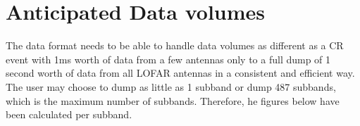 \documentclass[a4paper,10pt,bibtotoc]{scrartcl}
\begin{document}

\clearpage
\appendix


\section{Anticipated Data volumes}
\label{sec:data volumes}

The data format needs to be able to handle data volumes as different as a
CR event with 1ms worth of data from a few antennas only to a full dump of 1
second worth of data from all LOFAR antennas in a consistent and efficient way.
The user may choose to dump as little as 1 subband or dump 487 subbands, which
is the maximum number of subbands.
Therefore, he figures below have been calculated per subband.
\end{document}
